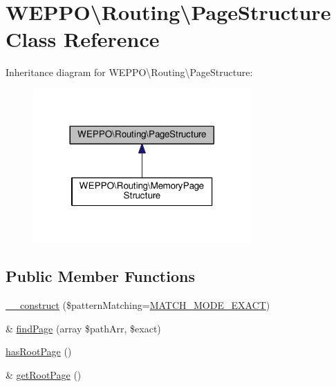 \hypertarget{classWEPPO_1_1Routing_1_1PageStructure}{}\section{W\+E\+P\+PO\textbackslash{}Routing\textbackslash{}Page\+Structure Class Reference}
\label{classWEPPO_1_1Routing_1_1PageStructure}


Inheritance diagram for W\+E\+P\+PO\textbackslash{}Routing\textbackslash{}Page\+Structure\+:\nopagebreak
\begin{figure}[H]
\begin{center}
\leavevmode
\includegraphics[width=236pt]{classWEPPO_1_1Routing_1_1PageStructure__inherit__graph}
\end{center}
\end{figure}
\subsection*{Public Member Functions}
\begin{DoxyCompactItemize}
\item 
\hyperlink{classWEPPO_1_1Routing_1_1PageStructure_a24610490f7f72a6e1069404f53a39928}{\+\_\+\+\_\+construct} (\$pattern\+Matching=\hyperlink{classWEPPO_1_1Routing_1_1PageStructure_acd456b36874bf5f113861b18edffa052}{M\+A\+T\+C\+H\+\_\+\+M\+O\+D\+E\+\_\+\+E\+X\+A\+CT})
\item 
\& \hyperlink{classWEPPO_1_1Routing_1_1PageStructure_aa10eb6a49414f998716d960724c279ba}{find\+Page} (array \$path\+Arr, \$exact)
\item 
\hyperlink{classWEPPO_1_1Routing_1_1PageStructure_a3b19feff0cf70327212a77b4aaad8a93}{has\+Root\+Page} ()
\item 
\& \hyperlink{classWEPPO_1_1Routing_1_1PageStructure_a56036f146200b6cfa0cbf40d6357b723}{get\+Root\+Page} ()
\end{DoxyCompactItemize}
